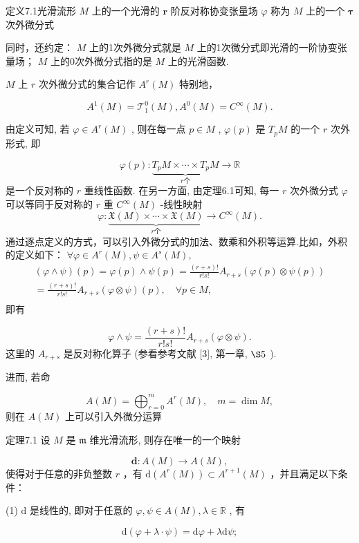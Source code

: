 定义7.1光滑流形  $M$  上的一个光滑的  $\pmb{r}$  阶反对称协变张量场 $\varphi$  称为  $M$  上的一个  $\pmb{\tau}$  次外微分式

同时，还约定： $M$  上的1次外微分式就是  $M$  上的1次微分式即光滑的一阶协变张量场； $M$  上的0次外微分式指的是  $M$  上的光滑函数.

$M$  上  $r$  次外微分式的集合记作  $A^r (M)$  特别地，

$$
A ^ {1} (M) = \mathcal {T} _ {1} ^ {0} (M), A ^ {0} (M) = C ^ {\infty} (M).
$$

由定义可知, 若  $\varphi \in A^{r}(M)$ , 则在每一点  $p \in M$ ,  $\varphi(p)$  是  $T_{p}M$  的一个  $r$  次外形式, 即

$$
\varphi (p): \underbrace {T _ {p} M \times \cdots \times T _ {p} M} _ {r   \text {个}} \to \mathbb {R}
$$
是一个反对称的  $r$  重线性函数. 在另一方面, 由定理6.1可知, 每一 $r$  次外微分式  $\varphi$  可以等同于反对称的  $r$  重  $C^\infty (M)$  -线性映射
$$
\varphi : \underbrace {\mathfrak {X} (M) \times \cdots \times \mathfrak {X} (M)} _ {r   \text {个}} \to C ^ {\infty} (M).
$$
通过逐点定义的方式，可以引入外微分式的加法、数乘和外积等运算.比如，外积的定义如下：  $\forall \varphi \in A^{r}(M),\psi \in A^{s}(M),$
$$
\begin{array}{l} (\varphi \wedge \psi) (p) = \varphi (p) \wedge \psi (p) = \frac {(r + s) !}{r ! s !} A _ {r + s} (\varphi (p) \otimes \psi (p)) \\ = \frac {(r + s) !}{r ! s !} A _ {r + s} (\varphi \otimes \psi) (p), \quad \forall p \in M, \\ \end{array}
$$
即有

$$
\varphi \wedge \psi = \frac {(r + s) !}{r ! s !} A _ {r + s} (\varphi \otimes \psi).
$$
这里的  $A_{r + s}$  是反对称化算子 (参看参考文献 [3], 第一章,  $\S 5$ ).

进而, 若命

$$
A (M) = \bigoplus_ {r = 0} ^ {m} A ^ {r} (M), \quad m = \dim M,
$$
则在  $A(M)$  上可以引入外微分运算

定理7.1 设  $M$  是  $\mathfrak{m}$  维光滑流形, 则存在唯一的一个映射

$$
\mathbf {d}: A (M) \rightarrow A (M),
$$
使得对于任意的非负整数  $r$ ，有  $\mathrm{d}(A^r (M))\subset A^{r + 1}(M)$ ，并且满足以下条件：

(1)  $\mathrm{d}$  是线性的, 即对于任意的  $\varphi, \psi \in A(M), \lambda \in \mathbb{R}$ , 有

$$
\mathrm {d} (\varphi + \lambda \cdot \psi) = \mathrm {d} \varphi + \lambda \mathrm {d} \psi ;
$$

